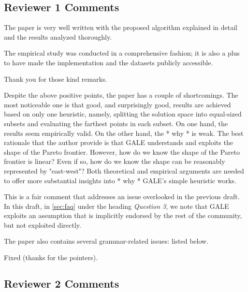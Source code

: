 \documentclass[10pt,journal,compsoc]{IEEEtran}
\newcommand{\tion}[1]{\textsection\ref{sec:#1}}
\newenvironment{changed}{\par}{\par}
\begin{document}
\subsection{Reviewer 1 Comments}

The paper is very well written with the proposed algorithm explained in detail and the results analyzed thoroughly.

The empirical study was conducted in a comprehensive fashion; it is also a plus to have made the implementation and the datasets publicly accessible.
\begin{changed}

Thank you for those kind remarks.
\end{changed}
Despite the above positive points, the paper has a
couple of shortcomings. The most noticeable one is
that good, and surprisingly good, results are
achieved based on only one heuristic, namely,
splitting the solution space into equal-sized
subsets and evaluating the farthest points in each
subset. On one hand, the results seem empirically
valid. On the other hand, the * why * is weak. The
best rationale that the author provide is that GALE
understands and exploits the shape of the Pareto
frontier. However, how do we know the shape of the
Pareto frontier is linear? Even if so, how do we
know the shape can be reasonably represented by
"east-west"? Both theoretical and empirical
arguments are needed to offer more substantial
insights into * why * GALE's simple heuristic works.

\begin{changed}
This is a fair comment that addresses an issue
overlooked in the previous draft. In this draft, in
\tion{faq} under the heading {\em Question 3}, we
note that GALE exploits an assumption that is
implicitly endorsed by the rest of the community,
but not exploited directly.
\end{changed}


The paper also contains several grammar-related issues: listed below.

\begin{changed}
Fixed (thanks for the pointers).
\end{changed}

\subsection{Reviewer 2 Comments}
\end{document}

